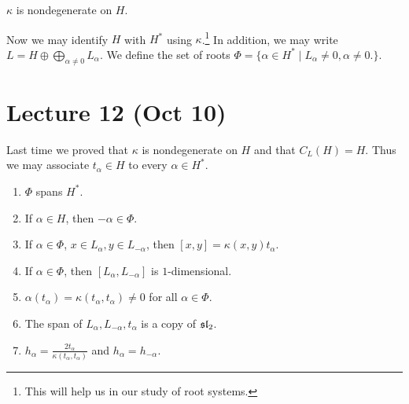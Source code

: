 \documentclass[twoside, 10pt]{article}
\begin{document}
    \begin{cor}
        $\kappa$ is nondegenerate on $H$.
    \end{cor}
     
    Now we may identify $H$ with $H^*$ using $\kappa$.\footnote{This will help us in our study of root systems.} In addition, we may write $L = H \oplus \bigoplus_{\alpha \neq 0}L_{\alpha}$. We define the set of roots $\Phi = \{ \alpha \in H^* \mid L_{\alpha} \neq 0, \alpha \neq 0.\}$.

    \section{Lecture 12 (Oct 10)}%
    \label{sec:lecture_12_oct_10_}
    
    Last time we proved that $\kappa$ is nondegenerate on $H$ and that $C_L(H) = H$. Thus we may associate $t_{\alpha} \in H$ to every $\alpha \in H^*$.

    \begin{prop}
        \begin{enumerate}
            \item $\Phi$ spans $H^*$.
            \item If $\alpha \in H$, then $-\alpha \in \Phi$.
            \item If $\alpha \in \Phi$, $x \in L_{\alpha}, y \in L_{-\alpha}$, then $[x,y] = \kappa(x,y)t_{\alpha}$.
            \item If $\alpha \in \Phi$, then $[L_{\alpha}, L_{-\alpha}]$ is $1$-dimensional.
            \item $\alpha(t_{\alpha}) = \kappa(t_{\alpha}, t_{\alpha}) \neq 0$ for all $\alpha \in \Phi$.
            \item The span of $L_{\alpha}, L_{-\alpha}, t_{\alpha}$ is a copy of $\mathfrak{sl}_2$.
            \item $h_{\alpha} = \frac{2t_{\alpha}}{\kappa(t_{\alpha}, t_{\alpha})}$ and $h_{\alpha} = h_{-\alpha}$.
        \end{enumerate}
    \end{prop}
\end{document}
